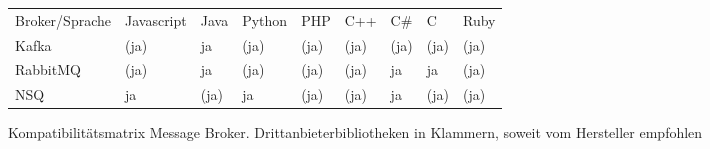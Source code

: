 \begin{figure}[]
	\begin{tabular}{l|llllllll}
		Broker/Sprache                         & Javascript & Java & Python & PHP  & C++  & C\#  & C    & Ruby \\
		\cline{1-9}
		Kafka \cite{KafkaClients:online}       & (ja)       & ja   & (ja)   & (ja) & (ja) & (ja) & (ja) & (ja) \\
		RabbitMQ \cite{RabbitMQClients:online} & (ja)       & ja   & (ja)   & (ja) & (ja) & ja   & ja   & (ja) \\
		NSQ \cite{NSQ:online}                  & ja         & (ja) & ja     & (ja) & (ja) & ja   & (ja) & (ja) \\
	\end{tabular}
	\caption{Kompatibilitätsmatrix Message Broker. Drittanbieterbibliotheken in Klammern, soweit vom Hersteller empfohlen}
	\label{compability:table}
\end{figure}